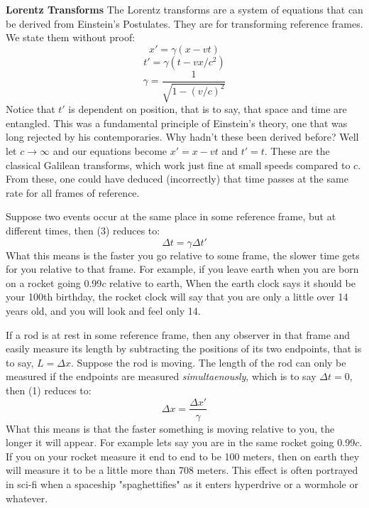 \documentclass[conference]{IEEEtran}
\begin{document}
\textbf{Lorentz Transforms} The Lorentz transforms are a system of equations that can be derived from Einstein's Postulates. They are for transforming reference frames. We state them without proof:
\begin{equation}
x' = \gamma(x - vt)
\end{equation}
\begin{equation} 
t' = \gamma(t - vx/c^2)
\end{equation}
\begin{equation}
\gamma = \frac{1}{\sqrt{1 - (v/c)^2}}
\end{equation}
Notice that $t'$ is dependent on position, that is to say, that space and time are entangled. This was a fundamental principle of Einstein's theory, one that was long rejected by his contemporaries. Why hadn't these been derived before? Well let $c \rightarrow \infty$ and our equations become $x' = x - vt$ and $t' = t$. These are the classical Galilean transforms, which work just fine at small speeds compared to $c$. From these, one could have deduced (incorrectly) that time passes at the same rate for all frames of reference. 

Suppose two events occur at the same place in some reference frame, but at different times, then (3) reduces to:
\begin{equation}
\Delta t = \gamma \Delta t'
\end{equation}
What this means is the faster you go relative to some frame, the slower time gets for you relative to that frame. For example, if you leave earth when you are born on a rocket going 0.99$c$ relative to earth, When the earth clock says it should be your 100th birthday, the rocket clock will say that you are only a little over 14 years old, and you will look and feel only 14. 

If a rod is at rest in some reference frame, then any observer in that frame and easily measure its length by subtracting the positions of its two endpoints, that is to say, $L = \Delta x$. Suppose the rod is moving. The length of the rod can only be measured if the endpoints are measured \textit{simultaenously}, which is to say $\Delta t = 0$, then (1) reduces to: 
\begin{equation}
\Delta x = \frac{\Delta x'}{\gamma}
\end{equation}
What this means is that the faster something is moving relative to you, the longer it will appear. For example lets say you are in the same rocket going 0.99$c$. If you on your rocket measure it end to end to be 100 meters, then on earth they will measure it to be a little more than 708 meters. This effect is often portrayed in sci-fi when a spaceship "spaghettifies" as it enters hyperdrive or a wormhole or whatever.
\end{document}
